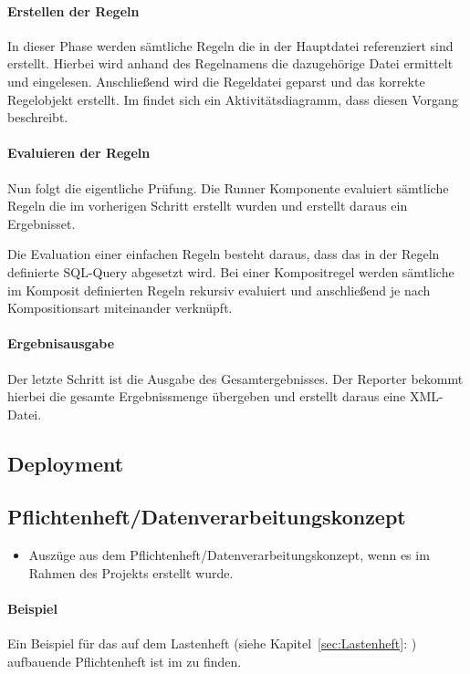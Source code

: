 \paragraph{Erstellen der Regeln}
In dieser Phase werden sämtliche Regeln die in der Hauptdatei referenziert sind erstellt. Hierbei wird anhand des Regelnamens die dazugehörige Datei ermittelt und eingelesen. Anschließend wird die Regeldatei geparst und das korrekte Regelobjekt erstellt. Im  findet sich ein Aktivitätsdiagramm, dass diesen Vorgang beschreibt.

\paragraph{Evaluieren der Regeln}
Nun folgt die eigentliche Prüfung. Die Runner Komponente evaluiert sämtliche Regeln die im vorherigen Schritt erstellt wurden und erstellt daraus ein Ergebnisset.

Die Evaluation einer einfachen Regeln besteht daraus, dass das in der Regeln definierte \acs{SQL}-Query abgesetzt wird. Bei einer Kompositregel werden sämtliche im Komposit definierten Regeln rekursiv evaluiert und anschließend je nach Kompositionsart miteinander verknüpft.

\paragraph{Ergebnisausgabe}
Der letzte Schritt ist die Ausgabe des Gesamtergebnisses. Der Reporter bekommt hierbei die gesamte Ergebnissmenge übergeben und erstellt daraus eine \acs{XML}-Datei.

\subsection{Deployment}
\label{sec:Deployment}

\subsection{Pflichtenheft/Datenverarbeitungskonzept}
\label{sec:Pflichtenheft}
\begin{itemize}
	\item Auszüge aus dem Pflichtenheft/Datenverarbeitungskonzept, wenn es im Rahmen des Projekts erstellt wurde.
\end{itemize}

\paragraph{Beispiel}
Ein Beispiel für das auf dem Lastenheft (siehe Kapitel~\ref{sec:Lastenheft}: ) aufbauende Pflichtenheft ist im  zu finden.


